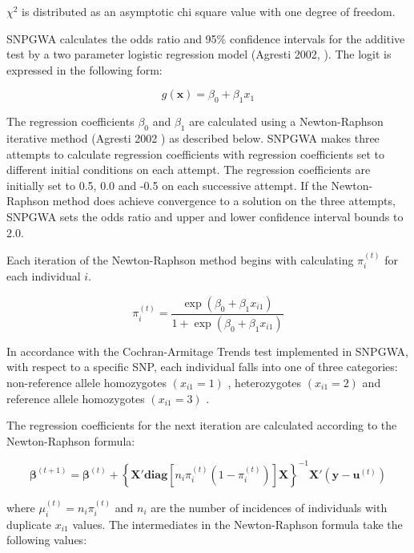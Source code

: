 \begin{enumerate}
$\chi^2$ is distributed as an asymptotic chi square value with one degree of freedom.

SNPGWA calculates the odds ratio and 95\% confidence intervals for the additive
test by a two parameter logistic regression model (Agresti 2002,
\cite{Agresti02}).  The logit is expressed in the following form:

\vspace{1em}
\begin{equation*}
  g(\mathbf{x}) = \beta_0 + \beta_1x_1
\end{equation*}

The regression coefficients $\beta_0$ and $\beta_1$ are calculated using a
Newton-Raphson iterative method (Agresti 2002 \cite{Agresti02}) as described
below.  SNPGWA makes three attempts to calculate regression coefficients with
regression coefficients set to different initial conditions on each attempt.
The regression coefficients are initially set to 0.5, 0.0 and -0.5 on each
successive attempt.  If the Newton-Raphson method does achieve convergence to a
solution on the three attempts, SNPGWA sets the odds ratio and upper and lower
confidence interval bounds to 2.0.

Each iteration of the Newton-Raphson method begins with calculating
$\pi_i^{(t)}$ for each individual $i$.

\begin{equation*}
  \pi_i^{(t)} = \frac{\exp(\beta_0 + \beta_1x_{i1})}{1+\exp(\beta_0 + \beta_1x_{i1})}
\end{equation*}

In accordance with the Cochran-Armitage Trends test implemented in SNPGWA, with
respect to a specific SNP, each individual falls into one of three categories:
non-reference allele homozygotes $(x_{i1}=1)$ , heterozygotes $(x_{i1}=2)$ and
reference allele homozygotes $(x_{i1}=3)$ .

The regression coefficients for the next iteration are calculated according to
the Newton-Raphson formula:

\begin{equation*}
  \boldsymbol{\beta}^{(t+1)} = \boldsymbol{\beta}^{(t)} + \left\{\mathbf{X'diag}[n_i\pi_i^{(t)}(1-\pi_i^{(t)})]\mathbf{X}\right\}^{-1}\mathbf{X'}(\mathbf{y}-\mathbf{u}^{(t)})
\end{equation*}

where $\mu_i^{(t)} = n_i\pi_i^{(t)}$ and $n_i$ are the number of incidences of
individuals with duplicate $x_{i1}$ values.  The intermediates in the
Newton-Raphson formula take the following values:


\end{enumerate}
